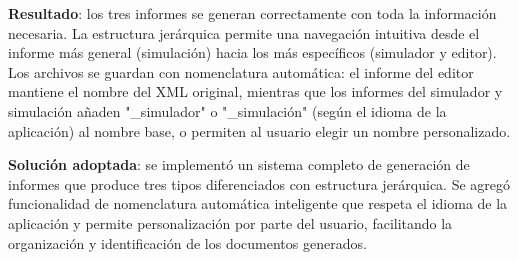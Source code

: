 \textbf{Resultado}: los tres informes se generan correctamente con toda la información necesaria. La estructura jerárquica permite una navegación intuitiva desde el informe más general (simulación) hacia los más específicos (simulador y editor). Los archivos se guardan con nomenclatura automática: el informe del editor mantiene el nombre del XML original, mientras que los informes del simulador y simulación añaden "\_simulador" o "\_simulación" (según el idioma de la aplicación) al nombre base, o permiten al usuario elegir un nombre personalizado.
\medskip

\textbf{Solución adoptada}: se implementó un sistema completo de generación de informes que produce tres tipos diferenciados con estructura jerárquica. Se agregó funcionalidad de nomenclatura automática inteligente que respeta el idioma de la aplicación y permite personalización por parte del usuario, facilitando la organización y identificación de los documentos generados.

